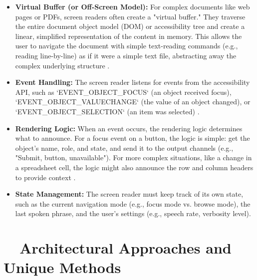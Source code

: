 \begin{itemize}
	\item \textbf{Virtual Buffer (or Off-Screen Model):} For complex documents like web pages or PDFs, screen readers often create a "virtual buffer." They traverse the entire document object model (DOM) or accessibility tree and create a linear, simplified representation of the content in memory. This allows the user to navigate the document with simple text-reading commands (e.g., reading line-by-line) as if it were a simple text file, abstracting away the complex underlying structure \cite{kingsbury2025, WSRPrimerCoverage}.
	\item \textbf{Event Handling:} The screen reader listens for events from the accessibility API, such as `EVENT\_OBJECT\_FOCUS` (an object received focus), `EVENT\_OBJECT\_VALUECHANGE` (the value of an object changed), or `EVENT\_OBJECT\_SELECTION` (an item was selected) \cite{UIAutomationOverview}.
	\item \textbf{Rendering Logic:} When an event occurs, the rendering logic determines what to announce. For a focus event on a button, the logic is simple: get the object's name, role, and state, and send it to the output channels (e.g., "Submit, button, unavailable"). For more complex situations, like a change in a spreadsheet cell, the logic might also announce the row and column headers to provide context \cite{Leporini2004}.
	\item \textbf{State Management:} The screen reader must keep track of its own state, such as the current navigation mode (e.g., focus mode vs. browse mode), the last spoken phrase, and the user's settings (e.g., speech rate, verbosity level).
\end{itemize}

\section{~~Architectural Approaches and Unique Methods}
\label{sec:architectural-approaches-and-unique-methods}

